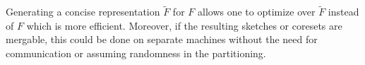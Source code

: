 \documentclass[anon,12pt]{colt2019} %
\newcommand{\R}{\mathbb{R}}
\begin{document}
Generating a concise representation $\tilde F$ for $F$ allows one to optimize over $\tilde F$ instead of $F$ which is more efficient. 
Moreover, if the resulting sketches or coresets are mergable, this could be done on separate machines without the need for communication or assuming randomness in the partitioning.

\end{document}
